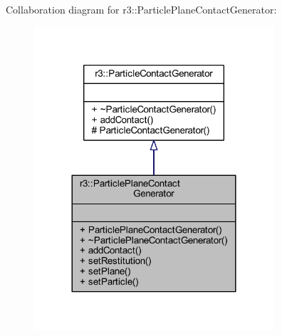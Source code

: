 Collaboration diagram for r3\+:\+:Particle\+Plane\+Contact\+Generator\+:\nopagebreak
\begin{figure}[H]
\begin{center}
\leavevmode
\includegraphics[width=252pt]{classr3_1_1_particle_plane_contact_generator__coll__graph}
\end{center}
\end{figure}
